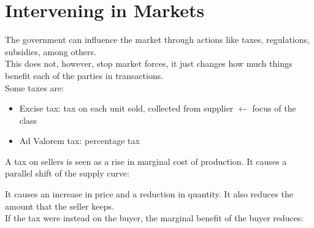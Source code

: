 \documentclass[nobib]{tufte-handout}
\begin{document}
\section{Intervening in Markets}
The government can influence the market through actions like taxes, regulations, subsidies, among others.\\
This does not, however, stop market forces, it just changes how much things benefit each of the parties in transactions.\\
Some taxes are:
\begin{itemize}
    \item Excise tax: tax on each unit sold, collected from supplier $\leftarrow$ focus of the class
    \item Ad Valorem tax: percentage tax
\end{itemize}
A tax on sellers is seen as a rise in marginal cost of production. It causes a parallel shift of the supply curve:
\begin{center}
\end{center}
It causes an increase in price and a reduction in quantity. It also reduces the amount that the seller keeps.\\
If the tax were instead on the buyer, the marginal benefit of the buyer reduces:
\end{document}
